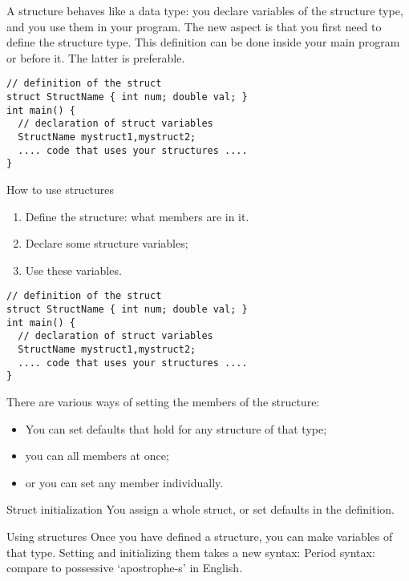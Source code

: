 A structure behaves like a data type: you declare variables of the
structure type, and you use them in your program. The new aspect is
that you first need to define the structure type. This definition can
be done inside your main program or before it. The latter is
preferable.

\begin{lstlisting}
// definition of the struct
struct StructName { int num; double val; }
int main() {
  // declaration of struct variables
  StructName mystruct1,mystruct2;
  .... code that uses your structures ....
}
\end{lstlisting}

\begin{slide}{How to use structures}
  \label{sl:structinprog}
  \begin{enumerate}
  \item Define the structure: what members are in it.
  \item Declare some structure variables;
  \item Use these variables.
  \end{enumerate}
\begin{lstlisting}
// definition of the struct
struct StructName { int num; double val; }
int main() {
  // declaration of struct variables
  StructName mystruct1,mystruct2;
  .... code that uses your structures ....
}
\end{lstlisting}
\end{slide}

There are various ways of setting the members of the structure:
\begin{itemize}
\item You can set defaults that hold for any structure of that type;
\item you can all members at once;
\item or you can set any member individually.
\end{itemize}

\begin{block}{Struct initialization}
  \label{sl:structinit}
  You assign a whole struct, or set defaults in the definition.
\end{block}

\begin{block}{Using structures}
  \label{sl:struct-use}
  Once you have defined a structure, you can make variables of that
  type. Setting and initializing them takes a new syntax:
  Period syntax: compare to possessive `apostrophe-s' in English.
\end{block}

